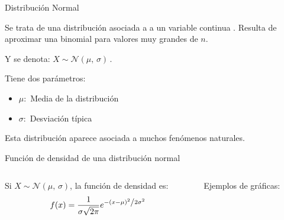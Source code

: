 \documentclass[11pt,handout]{beamer}
\begin{document}
\begin{frame}
{Distribución Normal}

Se trata de una distribución asociada a a un variable continua . Resulta de aproximar una binomial para valores muy grandes de $n$. 
\begin{block}{} Y se denota: $
X \sim \mathcal{N}(\mu,\,\sigma)\,.
    $ 
\end{block}
\pause
Tiene dos parámetros:
\begin{itemize} [<+->]
    \item $\mu :$ Media de la distribución
    \item $\sigma :$ Desviación típica
\end{itemize}

\pause    
Esta distribución aparece asociada a muchos fenómenos naturales. 
\end{frame}


\begin{frame}{Función de densidad de una distribución normal}  
\begin{columns}
\begin{column}{0.4\textwidth}
\begin{block}{}
Si $
X \sim \mathcal{N}(\mu,\,\sigma)
    $, la función de densidad es:
    $$f(x)=\frac{1}{{\sigma \sqrt {2\pi } }}e^{{{ - \left( {x - \mu } \right)^2 } \mathord{\left/ {\vphantom {{ - \left( {x - \mu } \right)^2 } {2\sigma ^2 }}} \right. \kern-\nulldelimiterspace} {2\sigma ^2 }}}$$
\end{block}
\end{column}
\begin{column}{0.6\textwidth} Ejemplos de gráficas:
\end{column}
\end{columns}{}

\end{frame}
\end{document}
